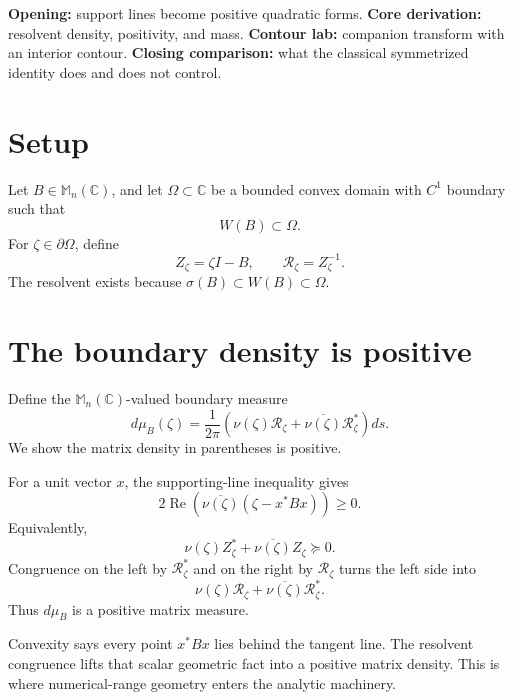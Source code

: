 \documentclass[11pt,oneside,openany]{book}
\theoremstyle{definition}
\theoremstyle{remark}
\newcommand{\C}{\mathbb C}
\newcommand{\Mn}{\mathbb M_n(\C)}
\newcommand{\RePart}{\operatorname{Re}}
\newcommand{\spec}{\sigma}
\begin{document}
\begin{workshopplan}
\textbf{Opening:} support lines become positive quadratic forms.
\textbf{Core derivation:} resolvent density, positivity, and mass.
\textbf{Contour lab:} companion transform with an interior contour.
\textbf{Closing comparison:} what the classical symmetrized identity
does and does not control.
\end{workshopplan}

\section{Setup}

Let \(B\in\Mn\), and let \(\Omega\subset\C\) be a bounded convex
domain with \(C^1\) boundary such that
\[
  W(B)\subset\Omega.
\]
For \(\zeta\in\partial\Omega\), define
\[
  Z_\zeta=\zeta I-B,
  \qquad
  \mathcal R_\zeta=Z_\zeta^{-1}.
\]
The resolvent exists because
\(\spec(B)\subset W(B)\subset\Omega\).

\section{The boundary density is positive}

Define the \(\Mn\)-valued boundary measure
\begin{equation}
  d\mu_B(\zeta)=\frac{1}{2\pi}
  \left(
    \nu(\zeta)\mathcal R_\zeta+
    \overline{\nu(\zeta)}\mathcal R_\zeta^*
  \right)ds.
  \label{eq:double-layer-measure}
\end{equation}
We show the matrix density in parentheses is positive.

For a unit vector \(x\), the supporting-line inequality gives
\[
  2\RePart\left(
  \overline{\nu(\zeta)}(\zeta-x^*Bx)\right)\geq0.
\]
Equivalently,
\begin{equation}
  \nu(\zeta)Z_\zeta^*
  +\overline{\nu(\zeta)}Z_\zeta\succeq0.
  \label{eq:support-matrix}
\end{equation}
Congruence on the left by \(\mathcal R_\zeta^*\) and on the right by
\(\mathcal R_\zeta\) turns the left side into
\[
  \nu(\zeta)\mathcal R_\zeta+
  \overline{\nu(\zeta)}\mathcal R_\zeta^*.
\]
Thus \(d\mu_B\) is a positive matrix measure.

\begin{intuitionbox}
Convexity says every point \(x^*Bx\) lies behind the tangent line.
The resolvent congruence lifts that scalar geometric fact into a
positive matrix density.  This is where numerical-range geometry
enters the analytic machinery.
\end{intuitionbox}
\end{document}
